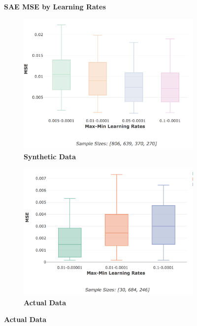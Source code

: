 \documentclass[a4paper,11pt,oneside]{article}
\theoremstyle{plain}
\theoremstyle{definition}
\begin{document}
\begin{figure}[H]
	\centering
	\textbf{SAE MSE by Learning Rates}
	\begin{subfigure}{.5\textwidth}
		\centering 
		\includegraphics[scale=0.25]{images/results/network/lr/synth_mse_minmax_lr.png}
		\caption{\textbf{Synthetic Data} 
			\newline }
		\label{figure-synth_mse_minmax_lr}
	\end{subfigure}%
	\begin{subfigure}{.5\textwidth}
		\centering 
		\includegraphics[scale=0.25]{images/results/network/lr/actual_mse_minmax_lr.png}
		\caption{\textbf{Actual Data} 
			\newline }

\end{subfigure}
\end{figure}
\end{document}
